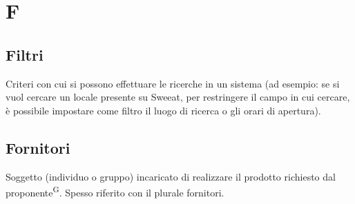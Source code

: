 \section{F}

\subsection{Filtri} Criteri con cui si possono effettuare le ricerche in un sistema (ad esempio: se si vuol cercare un locale presente su Sweeat, per restringere il campo in cui cercare, è possibile impostare come filtro il luogo di ricerca o gli orari di apertura).

\subsection{Fornitori}
Soggetto (individuo o gruppo) incaricato di realizzare il prodotto richiesto dal proponente\textsuperscript{G}. Spesso riferito con il plurale fornitori.

\clearpage
